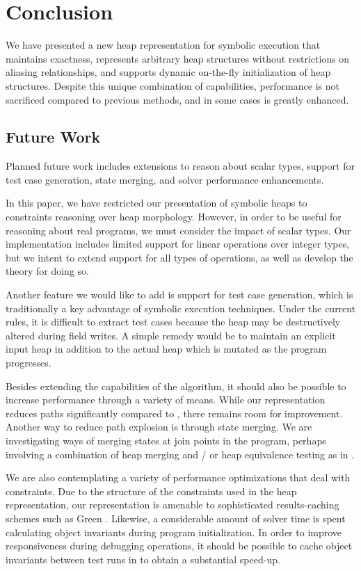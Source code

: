 \section{Conclusion}
We have presented a new heap representation for symbolic execution that maintains exactness, represents arbitrary heap structures without restrictions on aliasing relationships, and supports dynamic on-the-fly initialization of heap structures. Despite this unique combination of capabilities, performance is not sacrificed compared to previous methods, and in some cases is greatly enhanced.

\subsection{Future Work}
Planned future work includes extensions to reason about scalar types, support for test case generation, state merging, and solver performance enhancements.

In this paper, we have restricted our presentation of symbolic heaps to constraints reasoning over heap morphology. However, in order to be useful for reasoning about real programs, we must consider the impact of scalar types. Our implementation includes limited support for linear operations over integer types, but we intent to extend support for all types of operations, as well as develop the theory for doing so.

Another feature we would like to add is support for test case generation, which is traditionally a key advantage of symbolic execution techniques. Under the current rules, it is difficult to extract test cases because the heap may be destructively altered during field writes. A simple remedy would be to maintain an explicit input heap in addition to the actual heap which is mutated as the program progresses. 

Besides extending the capabilities of the algorithm, it should also be possible to increase performance through a variety of means. While our representation reduces paths significantly compared to \gsetxt{}, there remains room for improvement. Another way to reduce path explosion is through state merging. We are investigating ways of merging states at join points in the program, perhaps involving a combination of heap merging and / or heap equivalence testing as in \cite{Sen:2014}.

We are also contemplating a variety of performance optimizations that deal with constraints. Due to the structure of the constraints used in the heap representation, our representation is amenable to sophisticated results-caching schemes such as Green \cite{Visser:2012}. Likewise, a considerable amount of solver time is spent calculating object invariants during program initialization. In order to improve responsiveness during debugging operations, it should be possible to cache object invariants between test runs in to obtain a substantial speed-up.



